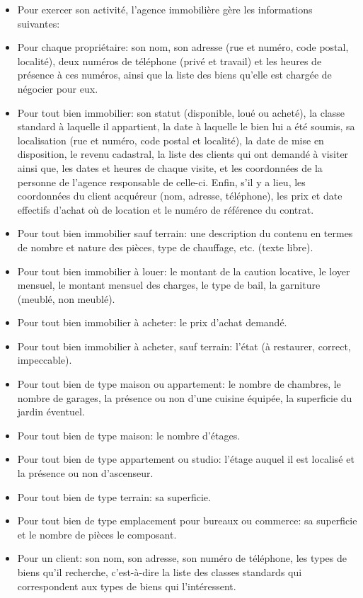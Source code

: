 \begin{itemize}
  \item Pour exercer son activité, l'agence immobilière gère les informations suivantes:
  \item Pour chaque propriétaire: son nom, son adresse (rue et numéro, code postal, localité), deux numéros de téléphone (privé et travail) et les heures de présence à ces numéros, ainsi que la liste des biens qu'elle est chargée de négocier pour eux.
  \item Pour tout bien immobilier: son statut (disponible, loué ou acheté), la classe standard à laquelle il appartient, la date à laquelle le bien lui a été soumis, sa localisation (rue et numéro, code postal et localité), la date de mise en disposition, le revenu cadastral, la liste des clients qui ont demandé à visiter ainsi que, les dates et heures de chaque visite, et les coordonnées de la personne de l'agence responsable de celle-ci. Enfin, s'il y a lieu, les coordonnées du client acquéreur (nom, adresse, téléphone), les prix et date effectifs d'achat où de location et le numéro de référence du contrat.
  \item Pour tout bien immobilier sauf terrain: une description du contenu en termes de nombre et nature des pièces, type de chauffage, etc. (texte libre).
  \item Pour tout bien immobilier à louer: le montant de la caution locative, le loyer mensuel, le montant mensuel des charges, le type de bail, la \og{}garniture\fg{} (meublé, non meublé).
  \item Pour tout bien immobilier à acheter: le prix d'achat demandé.
  \item Pour tout bien immobilier à acheter, sauf terrain: l'état (à restaurer, correct, impeccable).
  \item Pour tout bien de type \og{}maison\fg{} ou \og{}appartement\fg{}: le nombre de chambres, le nombre de garages, la présence ou non d'une cuisine équipée, la superficie du jardin éventuel.
  \item Pour tout bien de type \og{}maison\fg{}: le nombre d'étages.
  \item Pour tout bien de type \og{}appartement\fg{} ou \og{}studio\fg{}: l'étage auquel il est localisé et la présence ou non d'ascenseur.
  \item Pour tout bien de type \og{}terrain\fg{}: sa superficie.
  \item Pour tout bien de type \og{}emplacement pour bureaux ou commerce\fg{}: sa superficie et le nombre de pièces le composant.
  \item Pour un client: son nom, son adresse, son numéro de téléphone, les types de biens qu'il recherche, c'est-à-dire la liste des classes standards qui correspondent aux types de biens qui l'intéressent.
\end{itemize}

